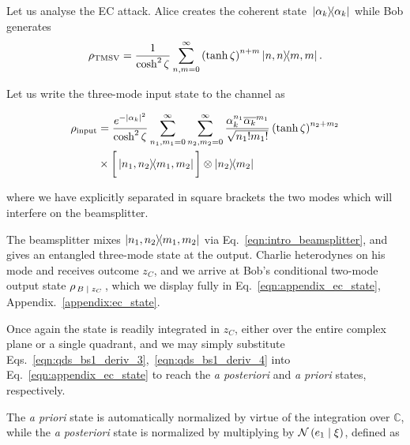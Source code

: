
Let us analyse the EC attack. Alice creates the coherent state $\dyad*{\alpha_k}$ while Bob generates
\begin{equation}\label{eqn:qds_ec_tmsv}
\tmsv = \frac{1}{\cosh^2 \zeta}  \sum_{n, m=0}^\infty \left(\tanh\zeta\right)^{n+m} \dyad{n, n}{m, m}.
\end{equation}

\noindent Let us write the three-mode input state to the channel as

\begin{align}
\rho_{\text{input}} &= \frac{e^{-\left|\alpha_k\right|^2}}{\cosh^2 \zeta} \sum_{n_1, m_1=0}^\infty \sum_{n_2, m_2=0}^{\infty} \frac{\alpha_k^{n_1} \overline{\alpha_k}^{m_1}}{\sqrt{n_1! m_1!}} \left(\tanh\zeta\right)^{n_2 + m_2} \notag \\
&\times \bigg[\dyad{n_1, n_2}{m_1, m_2}\bigg] \otimes \dyad{n_2}{m_2}
\end{align}

\noindent where we have explicitly separated in square brackets the two modes which will interfere on the beamsplitter.

The beamsplitter mixes $\dyad{n_1, n_2}{m_1, m_2}$ via Eq.~\ref{eqn:intro_beamsplitter}, and gives an entangled three-mode state at the output. Charlie heterodynes on his mode and receives outcome $z_C$, and we arrive at Bob's conditional two-mode output state $\rho_{\left. B \; \middle| \; z_C\right.}$, which we display fully in Eq.~\ref{eqn:appendix_ec_state}, Appendix.~\ref{appendix:ec_state}. %

Once again the state is readily integrated in $z_C$, either over the entire complex plane or a single quadrant, and we may simply substitute Eqs.~\ref{eqn:qds_bs1_deriv_3},~\ref{eqn:qds_bs1_deriv_4} into Eq.~\ref{eqn:appendix_ec_state} to reach the \emph{a posteriori} and \emph{a priori} states, respectively.

The \emph{a priori} state is automatically normalized by virtue of the integration over $\mathbb{C}$, while the \emph{a posteriori} state is normalized by multiplying by $\mathcal{N}\left(e_1 \; \middle| \; \xi \right)$, defined as 

